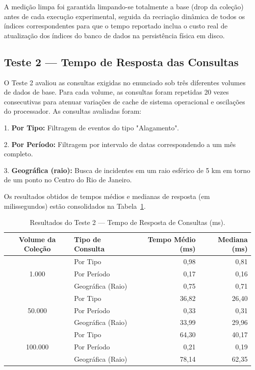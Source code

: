 \documentclass[12pt]{article}
\begin{document}
A medição limpa foi garantida limpando-se totalmente a base (drop da coleção) antes de cada execução experimental, seguida da recriação dinâmica de todos os índices correspondentes para que o tempo reportado inclua o custo real de atualização dos índices do banco de dados na persistência física em disco.

\subsection{Teste 2 --- Tempo de Resposta das Consultas}

O Teste 2 avaliou as consultas exigidas no enunciado sob três diferentes volumes de dados de base. Para cada volume, as consultas foram repetidas 20 vezes consecutivas para atenuar variações de cache de sistema operacional e oscilações do processador. As consultas avaliadas foram:

1. \textbf{Por Tipo:} Filtragem de eventos do tipo "Alagamento".

2. \textbf{Por Período:} Filtragem por intervalo de datas correspondendo a um mês completo.

3. \textbf{Geográfica (raio):} Busca de incidentes em um raio esférico de 5 km em torno de um ponto no Centro do Rio de Janeiro.

Os resultados obtidos de tempos médios e medianas de resposta (em milissegundos) estão consolidados na Tabela~\ref{tab:teste2}.

\begin{table}[ht]
\centering
\caption{Resultados do Teste 2 --- Tempo de Resposta de Consultas (ms).}
\label{tab:teste2}
\small
\begin{tabular}{clrr}
\toprule
\textbf{Volume da Coleção} & \textbf{Tipo de Consulta} & \textbf{Tempo Médio (ms)} & \textbf{Mediana (ms)} \\
\midrule
\multirow{3}{*}{1.000} 
 & Por Tipo & 0,98 & 0,81 \\
 & Por Período & 0,17 & 0,16 \\
 & Geográfica (Raio) & 0,75 & 0,71 \\
\midrule
\multirow{3}{*}{50.000} 
 & Por Tipo & 36,82 & 26,40 \\
 & Por Período & 0,33 & 0,31 \\
 & Geográfica (Raio) & 33,99 & 29,96 \\
\midrule
\multirow{3}{*}{100.000} 
 & Por Tipo & 64,30 & 40,17 \\
 & Por Período & 0,21 & 0,19 \\
 & Geográfica (Raio) & 78,14 & 62,35 \\
\bottomrule
\end{tabular}
\end{table}
\end{document}
